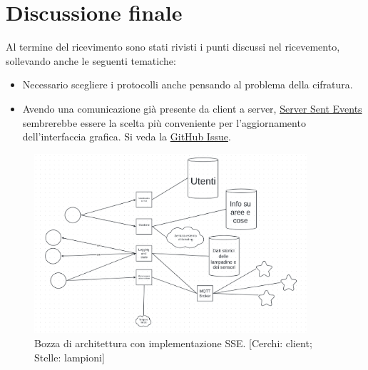 \section{Discussione finale}

Al termine del ricevimento sono stati rivisti i punti discussi nel ricevemento, sollevando anche le seguenti tematiche: 

\begin{itemize}    
    \item Necessario scegliere i protocolli anche pensando al problema della cifratura.
    \item Avendo una comunicazione già presente da client a server, \href{https://en.wikipedia.org/wiki/Server-sent_events}{Server Sent Events} sembrerebbe essere la scelta più conveniente per l'aggiornamento dell'interfaccia grafica. Si veda la \href{https://github.com/SWEasabi/verbali/issues/31#issuecomment-1429472831}{GitHub Issue}.
\end{itemize}

\begin{figure}[H]
    \includegraphics[width=0.9\textwidth]{contenuti/img/bozza_architettura.png}
    \centering
    \caption{Bozza di architettura con implementazione SSE. [Cerchi: client; Stelle: lampioni]}
\end{figure}